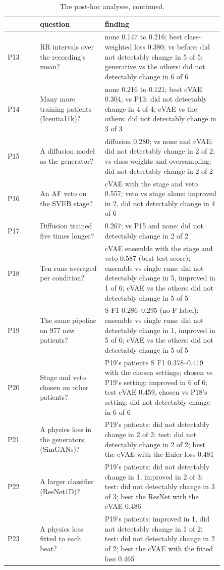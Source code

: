 \begin{table}[htbp]\centering\small
\caption{The post-hoc analyses, continued.}
\begin{tabular}{@{}lp{0.3\linewidth}p{0.55\linewidth}@{}}
\toprule
 & question & finding \\
\midrule
P13 & RR intervals over the recording's mean? & none 0.147 to 0.216; best class-weighted loss 0.380; vs before: did not detectably change in 5 of 5; generative vs the others: did not detectably change in 6 of 6 \\
P14 & Many more training patients (Icentia11k)? & none 0.216 to 0.121; best cVAE 0.304; vs P13: did not detectably change in 4 of 4; cVAE vs the others: did not detectably change in 3 of 3 \\
P15 & A diffusion model as the generator? & diffusion 0.280; vs none and cVAE: did not detectably change in 2 of 2; vs class weights and oversampling: did not detectably change in 2 of 2 \\
P16 & An AF veto on the SVEB stage? & cVAE with the stage and veto 0.557; veto vs stage alone: improved in 2, did not detectably change in 4 of 6 \\
P17 & Diffusion trained five times longer? & 0.267; vs P15 and none: did not detectably change in 2 of 2 \\
P18 & Ten runs averaged per condition? & cVAE ensemble with the stage and veto 0.587 (best test score); ensemble vs single runs: did not detectably change in 5, improved in 1 of 6; cVAE vs the others: did not detectably change in 5 of 5 \\
P19 & The same pipeline on 977 new patients? & S F1 0.286--0.295 (no F label); ensemble vs single runs: did not detectably change in 1, improved in 5 of 6; cVAE vs the others: did not detectably change in 5 of 5 \\
P20 & Stage and veto chosen on other patients? & P19's patients S F1 0.378--0.419 with the chosen settings; chosen vs P19's setting: improved in 6 of 6; test cVAE 0.459, chosen vs P18's setting: did not detectably change in 6 of 6 \\
P21 & A physics loss in the generators (SimGANs)? & P19's patients: did not detectably change in 2 of 2; test: did not detectably change in 2 of 2; best the cVAE with the Euler loss 0.481 \\
P22 & A larger classifier (ResNet1D)? & P19's patients: did not detectably change in 1, improved in 2 of 3; test: did not detectably change in 3 of 3; best the ResNet with the cVAE 0.486 \\
P23 & A physics loss fitted to each beat? & P19's patients: improved in 1, did not detectably change in 1 of 2; test: did not detectably change in 2 of 2; best the cVAE with the fitted loss 0.465 \\
\bottomrule
\end{tabular}
\end{table}
